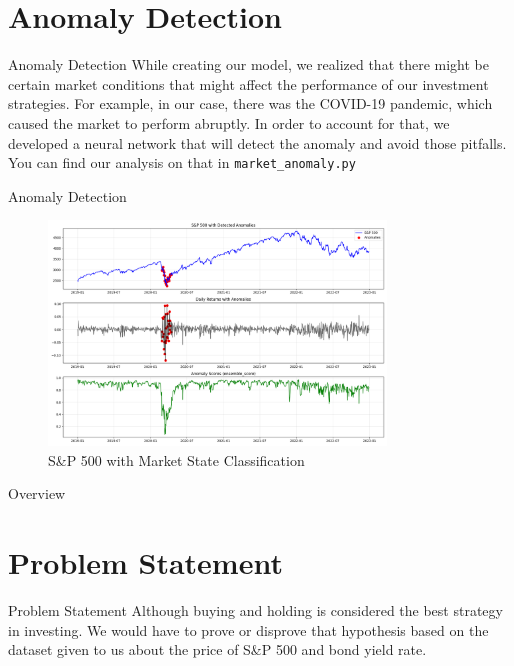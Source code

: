 \documentclass[aspectratio=169,xcolor=dvipsnames]{beamer}
\begin{document}
\section{Anomaly Detection}
\begin{frame}{Anomaly Detection}
	While creating our model, we realized that there might be certain market conditions that might affect the performance of our investment strategies. For example, in our case, there was the COVID-19 pandemic, which caused the market to perform abruptly. In order to account for that, we developed a neural network that will detect the anomaly and avoid those pitfalls. You can find our analysis on that in \texttt{market\_anomaly.py}
\end{frame}
\begin{frame}{Anomaly Detection}
	\begin{figure}
		\centering
		\includegraphics[width=0.8\textwidth]{anomalies_visualization.png}
		\caption{S\&P 500 with Market State Classification}
	\end{figure}
\end{frame}
\begin{frame}{Overview}
	\tableofcontents
\end{frame}


\section{Problem Statement}
\begin{frame}{Problem Statement}
	Although buying and holding is considered the best strategy in investing. We would have to prove or disprove that hypothesis based on the dataset given to us about the price of S\&P 500 and bond yield rate.
\end{frame}
\end{document}
